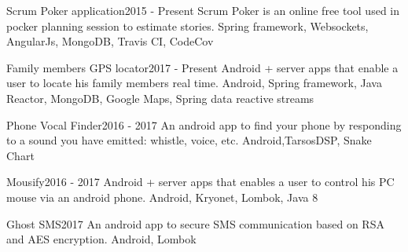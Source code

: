 %
%
%


\begin{projects}
	\project
	{Scrum Poker application}{2015 - Present}
	{ }
	{Scrum Poker is an online free tool used in pocker planning session to estimate stories.}
	{Spring framework, Websockets, AngularJs, MongoDB, Travis CI, CodeCov}
	
	\project
	{Family members GPS locator}{2017 - Present}
	{
	}
	{Android + server apps that enable a user to locate his family members real time.}
	{Android, Spring framework, Java Reactor, MongoDB, Google Maps, Spring data reactive streams }
				
	\project
	{Phone Vocal Finder}{2016 - 2017}
	{}
	{An android app to find your phone by responding to a sound you have emitted: whistle, voice, etc.}
	{Android,TarsosDSP, Snake Chart}
	
	\project
	{Mousify}{2016 - 2017}
	{
	}
	{Android + server apps that enables a user to control his PC mouse via an android phone.}
	{Android, Kryonet, Lombok, Java 8}
	
	\project
	{Ghost SMS}{2017}
	{}
	{An android app to secure SMS communication based on RSA and AES encryption.}
	{Android, Lombok}

\end{projects}